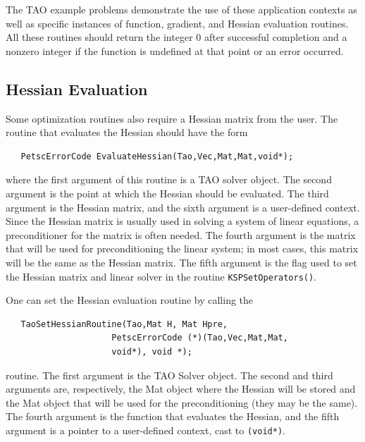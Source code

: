 \documentclass[]{book}
\begin{document}
The TAO example problems demonstrate the use of these application contexts
as well as specific instances of function, gradient, and Hessian 
evaluation routines.
All these routines should return the integer $0$ after 
successful completion and a nonzero integer if the function
is undefined at that point or an error occurred.

\subsection{Hessian Evaluation}
\label{sec_matrixfree}
\label{sec_finitedifference}

Some optimization routines also require a Hessian matrix from the user.
The routine that evaluates the Hessian should have the form 
\begin{verbatim}
   PetscErrorCode EvaluateHessian(Tao,Vec,Mat,Mat,void*);
\end{verbatim}
where the first argument of this routine is a TAO solver object.  The
second
argument is the point at which the Hessian should be evaluated.  The
third argument is the Hessian matrix, and the sixth argument is a
user-defined context.
Since the Hessian matrix is usually used in solving
a system of linear equations, a preconditioner for the matrix is often
needed.  The fourth argument is the matrix that will be used
for preconditioning the linear system; in most cases, this
matrix will be the same as the Hessian matrix.  The fifth
argument is the flag used to set the Hessian matrix and
linear solver in the routine {\tt KSPSetOperators()}.

One can set the Hessian evaluation routine by calling the %
\begin{verbatim}
   TaoSetHessianRoutine(Tao,Mat H, Mat Hpre,
                     PetscErrorCode (*)(Tao,Vec,Mat,Mat,
                     void*), void *);
\end{verbatim}
routine. 
The first argument is the TAO Solver object. The second and third arguments
are, respectively, the Mat object where the Hessian will be stored and 
the Mat object
that will be used for the preconditioning (they may be the same). The fourth 
argument is the function that evaluates the Hessian, 
and the fifth argument is a pointer to a user-defined context,
cast to {\tt (void*)}.
\end{document}
